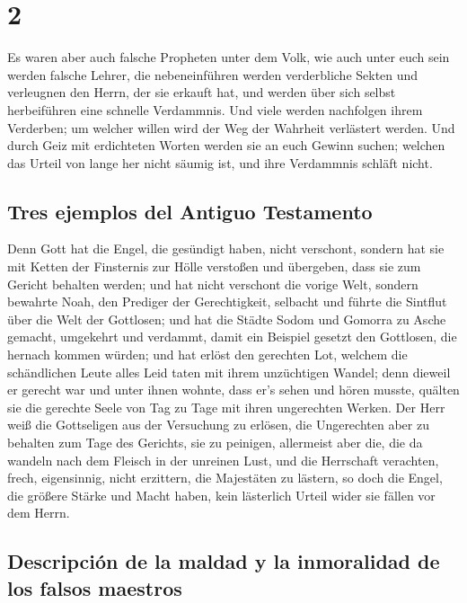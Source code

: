 \hypertarget{section-1}{%
\section{2}\label{section-1}}

 Es waren aber auch falsche Propheten unter dem Volk, wie
auch unter euch sein werden falsche Lehrer, die nebeneinführen werden
verderbliche Sekten und verleugnen den Herrn, der sie erkauft hat, und
werden über sich selbst herbeiführen eine schnelle Verdammnis.
 Und viele werden nachfolgen ihrem Verderben; um welcher
willen wird der Weg der Wahrheit verlästert werden.  Und
durch Geiz mit erdichteten Worten werden sie an euch Gewinn suchen;
welchen das Urteil von lange her nicht säumig ist, und ihre Verdammnis
schläft nicht.

\hypertarget{tres-ejemplos-del-antiguo-testamento}{%
\subsection{Tres ejemplos del Antiguo
Testamento}\label{tres-ejemplos-del-antiguo-testamento}}

 Denn Gott hat die Engel, die gesündigt haben, nicht
verschont, sondern hat sie mit Ketten der Finsternis zur Hölle verstoßen
und übergeben, dass sie zum Gericht behalten werden;  und
hat nicht verschont die vorige Welt, sondern bewahrte Noah, den Prediger
der Gerechtigkeit, selbacht und führte die Sintflut über die Welt der
Gottlosen;  und hat die Städte Sodom und Gomorra zu Asche
gemacht, umgekehrt und verdammt, damit ein Beispiel gesetzt den
Gottlosen, die hernach kommen würden;  und hat erlöst den
gerechten Lot, welchem die schändlichen Leute alles Leid taten mit ihrem
unzüchtigen Wandel;  denn dieweil er gerecht war und unter
ihnen wohnte, dass er's sehen und hören musste, quälten sie die gerechte
Seele von Tag zu Tage mit ihren ungerechten Werken.  Der
Herr weiß die Gottseligen aus der Versuchung zu erlösen, die Ungerechten
aber zu behalten zum Tage des Gerichts, sie zu peinigen, 
allermeist aber die, die da wandeln nach dem Fleisch in der unreinen
Lust, und die Herrschaft verachten, frech, eigensinnig, nicht erzittern,
die Majestäten zu lästern,  so doch die Engel, die
größere Stärke und Macht haben, kein lästerlich Urteil wider sie fällen
vor dem Herrn.

\hypertarget{descripciuxf3n-de-la-maldad-y-la-inmoralidad-de-los-falsos-maestros}{%
\subsection{Descripción de la maldad y la inmoralidad de los falsos
maestros}\label{descripciuxf3n-de-la-maldad-y-la-inmoralidad-de-los-falsos-maestros}}

